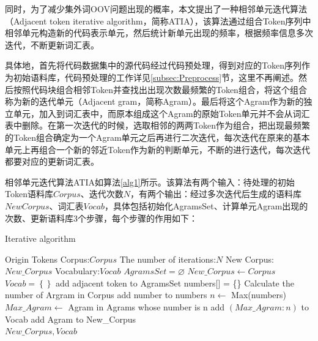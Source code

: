 同时，为了减少集外词OOV问题出现的概率，本文提出了一种相邻单元迭代算法（Adjacent token iterative algorithm，简称ATIA），该算法通过组合Token序列中相邻单元构造新的代码表示单元，然后统计新单元出现的频率，根据频率信息多次迭代，不断更新词汇表。

具体地，首先将代码数据集中的源代码经过代码预处理，得到对应的Token序列作为初始语料库，代码预处理的工作详见\ref{subsec:Preprocess}节，这里不再阐述。然后按照代码块组合相邻Token并查找出出现次数最频繁的Token组合，将这个组合称为新的迭代单元（Adjacent gram，简称Agram）。最后将这个Agram作为新的独立单元，加入到词汇表中，而原本组成这个Agram的原始Token单元并不会从词汇表中删除。在第一次迭代的时候，选取相邻的两两Token作为组合，把出现最频繁的Token组合确定为一个Agram单元之后再进行二次迭代，每次迭代在原来的基本单元上再组合一个新的邻近Token作为新的判断单元，不断的进行迭代，每次迭代都要对应的更新词汇表。

相邻单元迭代算法ATIA如算法\ref{alg1}所示。该算法有两个输入：待处理的初始Token语料库$Corpus$、迭代次数$N$，有两个输出：经过多次迭代后生成的语料库$NewCorpus$、词汇表$Vocab$，具体包括初始化AgramsSet、计算单元Agram出现的次数、更新语料库3个步骤，每个步骤的作用如下：

\begin{algorithm}[ht]  
	\renewcommand{\algorithmicrequire}{\textbf{Input:}}
	\renewcommand{\algorithmicensure}{\textbf{Output:}}
	\caption{Iterative algorithm}  
	\label{alg1}
	\begin{algorithmic}[1]
    \Require Origin Tokens Corpus:$Corpus$
    \Require The number of iterations:$N$
		\Ensure New Corpus: $New\_Corpus$
    \Ensure Vocabulary:$Vocab$
    \State $AgramsSet = \varnothing $ 
    \State $New\_Corpus \leftarrow Corpus $ 
    \State $Vocab = \left\{\right\} $  
          \State add adjacent token to AgramsSet
        \EndFor 
      \Else
        \State numbers[] = \{\} 
          \State Calculate the number of Argram in Corpus 
          \State add number to numbers  
        \EndFor 
        \State $n \leftarrow $ Max(numbers) 
        \State $Max\_Agram \leftarrow$ Agram in Agrams whose number is n
        \State add $\left(Max\_Agram:n\right)$ to Vocab 
        \State add Agram to New\_Corpus 
      \EndIf
    \EndFor \\
    \Return $New\_Corpus,Vocab$ 
	\end{algorithmic}
\end{algorithm}

